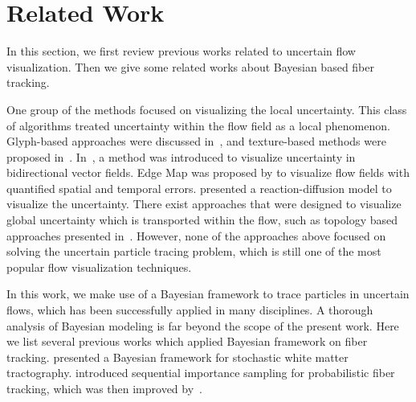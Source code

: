 \section{Related Work}

In this section, we first review previous works related to uncertain flow visualization. Then we give some related works about Bayesian based fiber tracking.

One group of the methods focused on visualizing the local uncertainty. This class of algorithms treated uncertainty within the flow field as a local phenomenon. Glyph-based approaches were discussed in~\cite{conf/visualization/LodhaPSW96, citeulike:4002316}, and texture-based methods were proposed in~\cite{10.1109/VIS.2005.97, botchen:2006:IVUF}. In~\cite{zuk:2008:UBVF}, a method was introduced to visualize uncertainty in bidirectional vector fields. Edge Map was proposed by \cite{10.1109/TVCG.2011.265} to visualize flow fields with quantified spatial and temporal errors. \cite{conf/visualization/SandersonJK04} presented a reaction-diffusion model to visualize the uncertainty. There exist approaches that were designed to visualize global uncertainty which is transported within the flow, such as topology based approaches presented in~\cite{Otto10a, Otto11a}. However, none of the approaches above focused on solving the uncertain particle tracing problem, which is still one of the most popular flow visualization techniques.

In this work, we make use of a Bayesian framework to trace particles in uncertain flows, which has been successfully applied in many disciplines. A thorough analysis of Bayesian modeling is far beyond the scope of the present work. Here we list several previous works which applied Bayesian framework on fiber tracking. \cite{frimanTMI06} presented a Bayesian framework for stochastic white matter tractography. \cite{bjornemoMICCAI02, Brun02whitematter} introduced sequential importance sampling for probabilistic fiber tracking, which was then improved by~\cite{journals/mia/PontabryROSKD13, Zhang20095}.
